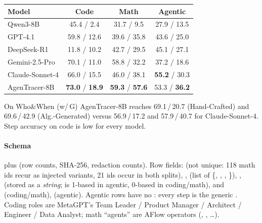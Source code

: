 \begin{center}\small
\begin{tabular}{@{}lccc@{}}\toprule
Model & Code & Math & Agentic\\\midrule
Qwen3-8B & 45.4 / 2.4 & 31.7 / 9.5 & 27.9 / 13.5\\
GPT-4.1 & 59.8 / 12.6 & 39.6 / 35.8 & 43.6 / 25.0\\
DeepSeek-R1 & 11.8 / 10.2 & 42.7 / 29.5 & 45.1 / 27.1\\
Gemini-2.5-Pro & 70.1 / 11.0 & 58.8 / 32.2 & 37.2 / 18.6\\
Claude-Sonnet-4 & 66.0 / 15.5 & 46.0 / 38.1 & \textbf{55.2} / 30.3\\
AgenTracer-8B & \textbf{73.0} / \textbf{18.9} & \textbf{59.3} / \textbf{57.6} & 53.3 / \textbf{36.2}\\\bottomrule
\end{tabular}
\end{center}
On Who\&When (w/\,G) AgenTracer-8B reaches 69.1\,/\,20.7 (Hand-Crafted) and 69.6\,/\,42.9 (Alg.-Generated) versus 56.9\,/\,17.2 and 57.9\,/\,40.7 for Claude-Sonnet-4. Step accuracy on code is low for every model.

\paragraph{Schema}  plus  (row counts, SHA-256, redaction counts). Row fields:  (not unique: 118 math ids recur as injected variants, 21 ids occur in both splits), ,  (list of \{, , , \}), ,  (stored as a \emph{string};  is 1-based in agentic, 0-based in coding/math),  and  (coding/math),  (agentic). Agentic rows have no : every step is the generic . Coding roles are MetaGPT's Team Leader / Product Manager / Architect / Engineer / Data Analyst; math ``agents'' are AFlow operators (, , \ldots).

